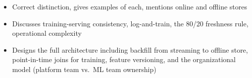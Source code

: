\begin{interviewq}

\goodgreat
\begin{itemize}
    \item {} Correct distinction, gives examples of each, mentions online and offline stores
    \item {} Discusses training-serving consistency, log-and-train, the 80/20 freshness rule, operational complexity
    \item {} Designs the full architecture including backfill from streaming to offline store, point-in-time joins for training, feature versioning, and the organizational model (platform team vs.\ ML team ownership)
\end{itemize}

\end{interviewq}